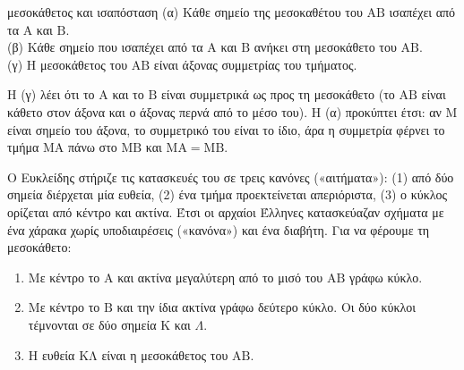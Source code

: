 \begin{idiotita}{μεσοκάθετος και ισαπόσταση}
(α) Κάθε σημείο της μεσοκαθέτου του $\mathrm{ΑΒ}$ ισαπέχει από τα $\mathrm{Α}$ και $\mathrm{Β}$.\\
(β) Κάθε σημείο που ισαπέχει από τα $\mathrm{Α}$ και $\mathrm{Β}$ ανήκει στη μεσοκάθετο του $\mathrm{ΑΒ}$.\\
(γ) Η μεσοκάθετος του $\mathrm{ΑΒ}$ είναι άξονας συμμετρίας του τμήματος.
\end{idiotita}

Η (γ) λέει ότι το $\mathrm{Α}$ και το $\mathrm{Β}$ είναι συμμετρικά ως προς τη μεσοκάθετο (το $\mathrm{ΑΒ}$ είναι κάθετο στον άξονα και ο άξονας περνά από το μέσο του). Η (α) προκύπτει έτσι: αν $\mathrm{Μ}$ είναι σημείο του άξονα, το συμμετρικό του είναι το ίδιο, άρα η συμμετρία φέρνει το τμήμα $\mathrm{ΜΑ}$ πάνω στο $\mathrm{ΜΒ}$ και $\mathrm{ΜΑ}=\mathrm{ΜΒ}$.


Ο Ευκλείδης στήριζε τις κατασκευές του σε τρεις κανόνες («αιτήματα»): (1) από δύο σημεία διέρχεται μία ευθεία, (2) ένα τμήμα προεκτείνεται απεριόριστα, (3) ο κύκλος ορίζεται από κέντρο και ακτίνα. Έτσι οι αρχαίοι Έλληνες κατασκεύαζαν σχήματα με ένα χάρακα χωρίς υποδιαιρέσεις («κανόνα») και ένα διαβήτη. Για να φέρουμε τη μεσοκάθετο:

\begin{enumerate}[leftmargin=1.6em,itemsep=0.3ex,topsep=2pt]
\item Με κέντρο το $\mathrm{Α}$ και ακτίνα μεγαλύτερη από το μισό του $\mathrm{ΑΒ}$ γράφω κύκλο.
\item Με κέντρο το $\mathrm{Β}$ και την ίδια ακτίνα γράφω δεύτερο κύκλο. Οι δύο κύκλοι τέμνονται σε δύο σημεία $\mathrm{Κ}$ και $\Lambda$.
\item Η ευθεία $\mathrm{ΚΛ}$ είναι η μεσοκάθετος του $\mathrm{ΑΒ}$.
\end{enumerate}

\begin{center}
\end{center}


